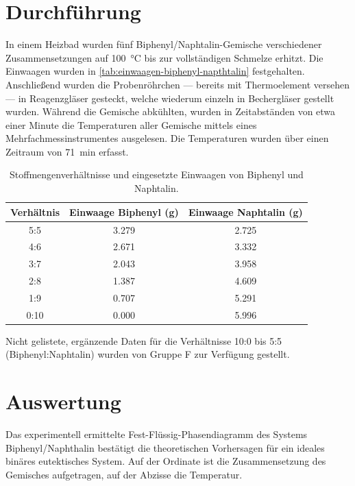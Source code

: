 \section{Durchführung}

In einem Heizbad wurden fünf Biphenyl/Naphtalin-Gemische verschiedener Zusammensetzungen auf \qty{100}{\degreeCelsius} bis zur vollständigen Schmelze erhitzt.
Die Einwaagen wurden in \autoref{tab:einwaagen-biphenyl-napthtalin} festgehalten.
Anschließend wurden die Probenröhrchen --- bereits mit Thermoelement versehen --- in Reagenzgläser gesteckt, welche wiederum einzeln in Bechergläser gestellt wurden.
Während die Gemische abkühlten, wurden in Zeitabständen von etwa einer Minute die Temperaturen aller Gemische mittels eines Mehrfachmessinstrumentes ausgelesen.
Die Temperaturen wurden über einen Zeitraum von \qty{71}{\minute} erfasst.

\begin{table}[h]
    \centering
    \caption{Stoffmengenverhältnisse und eingesetzte Einwaagen von Biphenyl und Naphtalin.}
    \begin{tabular}{c c c}
        \toprule
         Verhältnis & Einwaage Biphenyl (g)  & Einwaage Naphtalin (g) \\ \midrule
         5:5        & 3.279 & 2.725 \\ \midrule
         4:6        & 2.671 & 3.332 \\ \midrule
         3:7        & 2.043 & 3.958 \\ \midrule
         2:8        & 1.387 & 4.609 \\ \midrule
         1:9        & 0.707 & 5.291 \\ \midrule
         0:10       & 0.000 & 5.996 \\
         \bottomrule
    \end{tabular}
    \label{tab:einwaagen-biphenyl-napthtalin}
\end{table}

Nicht gelistete, ergänzende Daten für die Verhältnisse 10:0 bis 5:5 (Biphenyl:Naphtalin) wurden von Gruppe F zur Verfügung gestellt.

\section{Auswertung}

Das experimentell ermittelte Fest-Flüssig-Phasendiagramm des Systems Biphenyl/Naphthalin bestätigt die theoretischen Vorhersagen für ein ideales binäres eutektisches System.
Auf der Ordinate ist die Zusammensetzung des Gemisches aufgetragen, auf der Abzisse die Temperatur.

